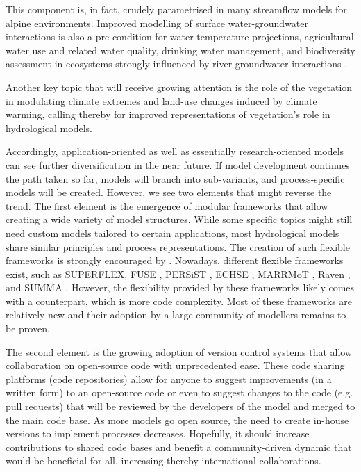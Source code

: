 \documentclass[10pt,a4paper]{article}
\begin{document}
This component is, in fact, crudely parametrised in many streamflow models for alpine environments. Improved modelling of surface water-groundwater interactions is also a pre-condition for water temperature projections, agricultural water use and related water quality, drinking water management, and biodiversity assessment in ecosystems strongly influenced by river-groundwater interactions \citep{Brunner2017}. 

Another key topic that will receive growing attention is the role of the vegetation in modulating climate extremes \citep{Mastrotheodoros2020} and land-use changes induced by climate warming, calling thereby for improved representations of vegetation's role in hydrological models.

Accordingly, application-oriented as well as essentially research-oriented models can see further diversification in the near future. If model development continues the path taken so far, models will branch into sub-variants, and process-specific models will be created. However, we see two elements that might reverse the trend. The first element is the emergence of modular frameworks that allow creating a wide variety of model structures. While some specific topics might still need custom models tailored to certain applications, most hydrological models share similar principles and process representations. The creation of such flexible frameworks is strongly encouraged by \citet{Clark2011a}. Nowadays, different flexible frameworks exist, such as SUPERFLEX, FUSE \citep{Clark2008}, PERSiST \citep{Futter2014}, ECHSE \citep{Kneis2015}, MARRMoT \citep{Knoben2019}, Raven \citep{Craig2020}, and SUMMA \citep{Clark2015}. {However, the flexibility provided by these frameworks likely comes with a counterpart, which is more code complexity. Most of these frameworks are relatively new and their adoption by a large community of modellers remains to be proven}.

The second element is the growing adoption of version control systems that allow collaboration on open-source code with unprecedented ease. These code sharing platforms (code repositories) allow for anyone to suggest improvements (in a written form) to an open-source code or even to suggest changes to the code (e.g. pull requests) that will be reviewed by the developers of the model and merged to the main code base. As more models go open source, the need to create in-house versions to implement processes decreases. Hopefully, it should increase contributions to shared code bases and benefit a community-driven dynamic that would be beneficial for all, increasing thereby international collaborations.
\end{document}

